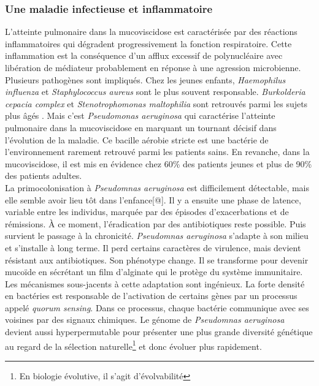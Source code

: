 \documentclass[12pt,a4paper]{article}
\begin{document}
\subsubsection{Une maladie infectieuse et inflammatoire}

L’atteinte pulmonaire dans la mucoviscidose est caractérisée par des réactions inflammatoires qui dégradent progressivement la fonction respiratoire. Cette inflammation est la conséquence d'un afflux excessif de polynucléaire avec libération de médiateur\cite{Heijerman2005} probablement en réponse à une agression microbienne. Plusieurs pathogènes sont impliqués. Chez les jeunes enfants\cite{Davies}, \textit{Haemophilus influenza} et \textit{Staphylococcus aureus} sont le plus souvent responsable. \textit{Burkolderia cepacia complex} et \textit{Stenotrophomonas maltophilia} sont retrouvés parmi les sujets plus âgés \cite{Davies}.
Mais c’est \textit{Pseudomonas aeruginosa} qui caractérise l’atteinte pulmonaire dans la mucoviscidose en marquant un tournant décisif dans l’évolution de la maladie. Ce bacille aérobie stricte est une bactérie de l'environnement rarement retrouvé parmi les patients sains\cite{Plesiat}. En revanche, dans la mucoviscidose, il est mis en évidence\cite{LeBourgeois}  chez 60\% des patients jeunes et plus de 90\% des patients adultes.\\
La primocolonisation à \textit{Pseudomnas aeruginosa} est difficilement détectable, mais elle semble avoir lieu tôt dans l’enfance[@]. Il y a ensuite une phase de latence, variable entre les individus, marquée par des épisodes d’exacerbations et de rémissions. À ce moment, l’éradication par des antibiotiques reste possible.
Puis survient le passage à la chronicité. \textit{Pseudomnas aeruginosa} s'adapte à son milieu et s’installe à long terme. Il perd certains caractères de virulence, mais devient résistant aux antibiotiques\cite{LeBourgeois}. Son phénotype change. Il se transforme pour devenir mucoïde en sécrétant un film d’alginate qui le protège du système immunitaire. Les mécanismes sous-jacents à cette adaptation sont ingénieux. La forte densité en bactéries est responsable de l’activation de certains gènes par un processus appelé \textit{quorum sensing}\cite{Ruimy2004}. Dans ce processus, chaque bactérie communique avec ses voisines par des signaux chimiques.
Le génome de \textit{Pseudomnas aeruginosa} devient aussi hyperpermutable\cite{Davies} pour présenter une plus grande diversité génétique au regard de la sélection naturelle\footnote{En biologie évolutive, il s'agit d'évolvabilité} et donc évoluer plus rapidement. \\
\end{document}
